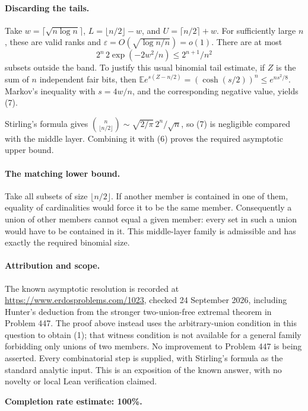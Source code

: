 \paragraph{Discarding the tails.}
Take \(w=\lceil\sqrt{n\log n}\rceil\),
\(L=\lfloor n/2\rfloor-w\), and \(U=\lceil n/2\rceil+w\).
For sufficiently large \(n\), these are valid ranks and
\(\varepsilon=O(\sqrt{\log n/n})=o(1)\).
There are at most
\[
 2^n\,2\exp(-2w^2/n)\leq 2^{n+1}/n^2 \tag{7}
\]
subsets outside the band. To justify this usual binomial tail estimate, if \(Z\) is the sum of \(n\) independent fair bits, then
\(\mathbb E e^{s(Z-n/2)}=(\cosh(s/2))^n\leq e^{ns^2/8}\).
Markov's inequality with \(s=4w/n\), and the corresponding negative value, yields (7).

Stirling's formula gives
\(\binom n{\lfloor n/2\rfloor}\sim\sqrt{2/\pi}\,2^n/\sqrt n\), so (7) is negligible compared with the middle layer. Combining it with (6) proves the required asymptotic upper bound.

\paragraph{The matching lower bound.}
Take all subsets of size \(\lfloor n/2\rfloor\). If another member is contained in one of them, equality of cardinalities would force it to be the same member. Consequently a union of other members cannot equal a given member: every set in such a union would have to be contained in it. This middle-layer family is admissible and has exactly the required binomial size.

\paragraph{Attribution and scope.}
The known asymptotic resolution is recorded at \url{https://www.erdosproblems.com/1023}, checked 24 September 2026, including Hunter's deduction from the stronger two-union-free extremal theorem in Problem 447. The proof above instead uses the arbitrary-union condition in this question to obtain (1); that witness condition is not available for a general family forbidding only unions of two members. No improvement to Problem 447 is being asserted. Every combinatorial step is supplied, with Stirling's formula as the standard analytic input. This is an exposition of the known answer, with no novelty or local Lean verification claimed.

\textbf{Completion rate estimate: 100\%.}
